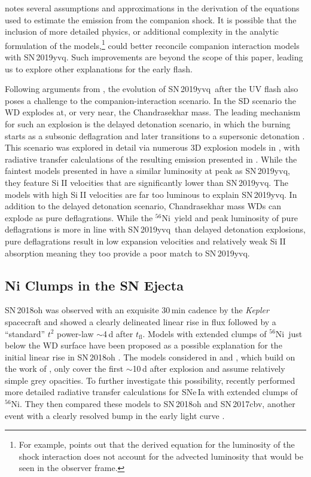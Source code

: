 \documentclass[twocolumn]{aastex63}
\def\ion#1#2{#1$\;${\footnotesize\rm{#2}}\relax}
\newcommand{\tfl}{$t_\mathrm{fl}$}
\newcommand{\radni}{$^{56}$Ni}
\newcommand{\sn}{SN\,2019yvq}
\begin{document}
\citet{Kasen10a} notes several assumptions and approximations in the
derivation of the equations used to estimate the emission from the companion
shock. It is possible that the inclusion of more detailed physics, or
additional complexity in the analytic formulation of the models,\footnote{For
example, \citet{Kasen10a} points out that the derived equation for the
luminosity of the shock interaction does not account for the advected
luminosity that would be seen in the observer frame.} could better reconcile
companion interaction models with \sn. Such improvements are beyond the scope
of this paper, leading us to explore other explanations for the early flash.

Following arguments from \citet{Kromer16}, the evolution of \sn\ after the UV
flash also poses a challenge to the companion-interaction scenario. In the SD
scenario the WD explodes at, or very near, the Chandrasekhar mass. The leading
mechanism for such an explosion is the delayed detonation scenario, in which
the burning starts as a subsonic deflagration and later transitions to a
supersonic detonation \citep{Khokhlov91}. This scenario was explored in detail
via numerous 3D explosion models in \citet{Seitenzahl13}, with radiative
transfer calculations of the resulting emission presented in \citet{Sim13}.
While the faintest models presented in \citet{Sim13} have a similar luminosity
at peak as \sn, they feature \ion{Si}{II} velocities that are significantly
lower than \sn. The \citeauthor{Sim13} models with high \ion{Si}{II}
velocities are far too luminous to explain \sn. In addition to the delayed
detonation scenario, Chandrasekhar mass WDs can explode as pure deflagrations.
While the \radni\ yield and peak luminosity of pure deflagrations is more in
line with \sn\ than delayed detonation explosions, pure deflagrations result
in low expansion velocities and relatively weak \ion{Si}{II} absorption
\citep[e.g.,][]{Fink14} meaning they too provide a poor match to \sn.


\subsection{Ni Clumps in the SN Ejecta}

SN\,2018oh was observed with an exquisite 30\,min cadence by the
\textit{Kepler} spacecraft and showed a clearly delineated linear rise in flux
followed by a ``standard'' $t^2$ power-law $\sim$4\,d after \tfl. Models with
extended clumps of \radni\ just below the WD surface have been proposed as a
possible explanation for the initial linear rise in SN\,2018oh
\citep{Shappee19,Dimitriadis19}. The models considered in \citet{Shappee19}
and \citet{Dimitriadis19}, which build on the work of \citet{Piro16}, only
cover the first $\sim$10\,d after explosion and assume relatively simple grey
opacities. To further investigate this possibility, \citet{Magee20a} recently
performed more detailed radiative transfer calculations for SNe\,Ia with
extended clumps of \radni. They then compared these models to SN\,2018oh and
SN\,2017cbv, another event with a clearly resolved bump in the early light
curve \citep{Hosseinzadeh17}.
\end{document}
